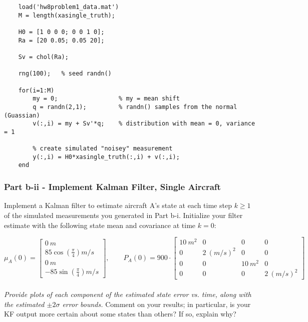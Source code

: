 \documentclass[]{article}
\begin{document}
\begin{lstlisting}
	load('hw8problem1_data.mat')
	M = length(xasingle_truth);
	
	H0 = [1 0 0 0; 0 0 1 0];
	Ra = [20 0.05; 0.05 20];
	
	Sv = chol(Ra);
	
	rng(100); 	% seed randn()
	
	for(i=1:M)
		my = 0;                 % my = mean shift
		q = randn(2,1);         % randn() samples from the normal (Guassian)
		v(:,i) = my + Sv'*q;    % distribution with mean = 0, variance = 1   
	
		% create simulated "noisey" measurement
		y(:,i) = H0*xasingle_truth(:,i) + v(:,i);
	end
\end{lstlisting}

\subsubsection*{Part b-ii - Implement Kalman Filter, Single Aircraft}

Implement a Kalman filter to estimate aircraft A’s state at each time step $k \geq 1$ of the simulated measurements you generated in Part b-i. Initialize your filter estimate with the following state mean and covariance at time $k=0$:

$$
\mu_A\left(0\right)=\left[
\begin{array}{c} 0\:m\\ 85\cos\left(\frac{\pi}{4}\right) m/s\\ 0\:m\\ -85\sin\left(\frac{\pi}{4}\right) m/s
\end{array}\right],\qquad
P_A\left(0\right)=900\cdot\left[
\begin{array}{cccc}
10\:m^2 & 0          & 0       & 0\\
0       & 2\:(m/s)^2 & 0       & 0\\
0       & 0          & 10\:m^2 & 0\\
0       & 0          & 0       & 2\:(m/s)^2
\end{array}
\right]
$$\\

\noindent \textit{Provide plots of each component of the estimated state error vs. time, along with the estimated $\pm2\sigma$ error bounds.} Comment on your results; in particular, is your KF output more certain about some states than others? If so, explain why?\\
\end{document}
